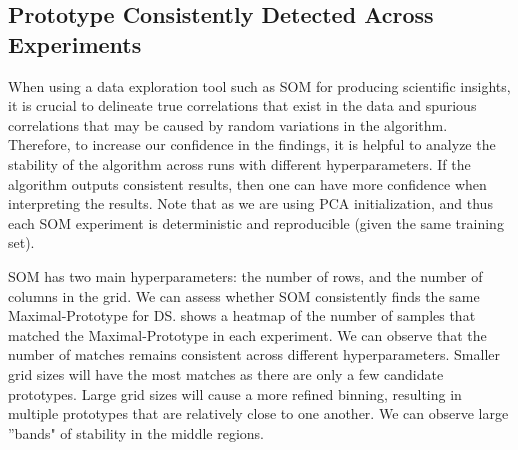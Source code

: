 

\subsection*{Prototype Consistently Detected Across Experiments}

When using a data exploration tool such as SOM for producing scientific insights, it is crucial to delineate true correlations that exist in the data and spurious correlations that may be caused by random variations in the algorithm. Therefore, to increase our confidence in the findings, it is helpful to analyze the stability of the algorithm across runs with different hyperparameters. If the algorithm outputs consistent results, then one can have more confidence when interpreting the results. Note that as we are using PCA initialization, and thus each SOM experiment is deterministic and reproducible (given the same training set).

SOM has two main hyperparameters: the number of rows, and the number of columns in the grid. We can assess whether SOM consistently finds the same Maximal-Prototype for DS. 
 shows a heatmap of the number of samples that matched the Maximal-Prototype in each experiment. We can observe that the number of matches remains consistent across different hyperparameters. Smaller grid sizes will have the most matches as there are only a few candidate prototypes. Large grid sizes will cause a more refined binning, resulting in multiple prototypes that are relatively close to one another. We can observe large ''bands" of stability in the middle regions.


